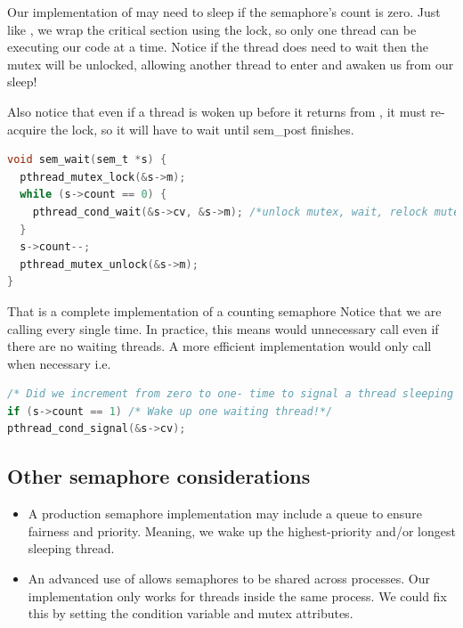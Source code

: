 Our implementation of  may need to sleep if the semaphore's count is zero.
Just like , we wrap the critical section using the lock, so only one thread can be executing our code at a time.
Notice if the thread does need to wait then the mutex will be unlocked, allowing another thread to enter  and awaken us from our sleep!

Also notice that even if a thread is woken up before it returns from , it must re-acquire the lock, so it will have to wait until sem\_post finishes.

\begin{lstlisting}[language=C]
void sem_wait(sem_t *s) {
  pthread_mutex_lock(&s->m);
  while (s->count == 0) {
    pthread_cond_wait(&s->cv, &s->m); /*unlock mutex, wait, relock mutex*/
  }
  s->count--;
  pthread_mutex_unlock(&s->m);
}
\end{lstlisting}

That is a complete implementation of a counting semaphore
Notice that we are calling  every single time.
In practice, this means  would unnecessary call  even if there are no waiting threads.
A more efficient implementation would only call  when necessary i.e.

\begin{lstlisting}[language=C]
/* Did we increment from zero to one- time to signal a thread sleeping inside sem_post */
if (s->count == 1) /* Wake up one waiting thread!*/
pthread_cond_signal(&s->cv);
\end{lstlisting}

\subsection{Other semaphore considerations}

\begin{itemize}
\tightlist
\item
  A production semaphore implementation may include a queue to ensure fairness and priority.
  Meaning, we wake up the highest-priority and/or longest sleeping thread.
\item
  An advanced use of  allows semaphores to be shared across processes.
  Our implementation only works for threads inside the same process.
  We could fix this by setting the condition variable and mutex attributes.
\end{itemize}

